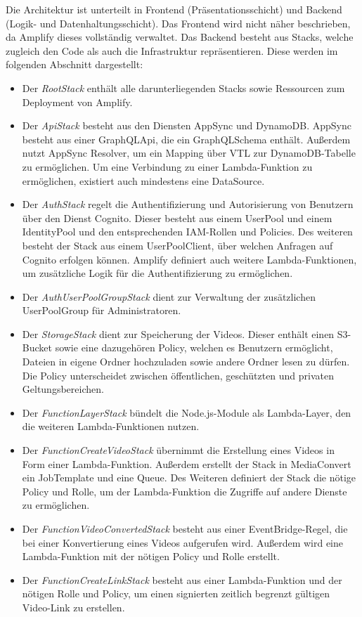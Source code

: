 Die Architektur ist unterteilt in Frontend (Präsentationsschicht) und Backend (Logik- und Datenhaltungsschicht). Das Frontend wird nicht näher beschrieben, da Amplify dieses vollständig verwaltet. Das Backend besteht aus Stacks, welche zugleich den Code als auch die Infrastruktur repräsentieren. Diese werden im folgenden Abschnitt dargestellt:
\begin{itemize}
  \item{Der \textit{RootStack} enthält alle darunterliegenden Stacks sowie Ressourcen zum Deployment von Amplify.}

  \item{Der \textit{ApiStack} besteht aus den Diensten AppSync und DynamoDB. AppSync besteht aus einer GraphQLApi, die ein GraphQLSchema enthält. Außerdem nutzt AppSync Resolver, um ein Mapping über VTL zur DynamoDB-Tabelle zu ermöglichen. Um eine Verbindung zu einer Lambda-Funktion zu ermöglichen, existiert auch mindestens eine DataSource.}

  \item{Der \textit{AuthStack} regelt die Authentifizierung und Autorisierung von Benutzern über den Dienst Cognito. Dieser besteht aus einem UserPool und einem IdentityPool und den entsprechenden IAM-Rollen und Policies. Des weiteren besteht der Stack aus einem UserPoolClient, über welchen Anfragen auf Cognito erfolgen können. Amplify definiert auch weitere Lambda-Funktionen, um zusätzliche Logik für die Authentifizierung zu ermöglichen.}

  \item{Der \textit{AuthUserPoolGroupStack} dient zur Verwaltung der zusätzlichen UserPoolGroup für Administratoren.}

  \item{Der \textit{StorageStack} dient zur Speicherung der Videos. Dieser enthält einen S3-Bucket sowie eine dazugehören Policy, welchen es Benutzern ermöglicht, Dateien in eigene Ordner hochzuladen sowie andere Ordner lesen zu dürfen. Die Policy unterscheidet zwischen öffentlichen, geschützten und privaten Geltungsbereichen.}

  \item{Der \textit{FunctionLayerStack} bündelt die Node.js-Module als Lambda-Layer, den die weiteren Lambda-Funktionen nutzen.}

  \item{Der \textit{FunctionCreateVideoStack} übernimmt die Erstellung eines Videos in Form einer Lambda-Funktion. Außerdem erstellt der Stack in MediaConvert ein JobTemplate und eine Queue. Des Weiteren definiert der Stack die nötige Policy und Rolle, um der Lambda-Funktion die Zugriffe auf andere Dienste zu ermöglichen.}

  \item{Der \textit{FunctionVideoConvertedStack} besteht aus einer EventBridge-Regel, die bei einer Konvertierung eines Videos aufgerufen wird. Außerdem wird eine Lambda-Funktion mit der nötigen Policy und Rolle erstellt.}

  \item{Der \textit{FunctionCreateLinkStack} besteht aus einer Lambda-Funktion und der nötigen Rolle und Policy, um einen signierten zeitlich begrenzt gültigen Video-Link zu erstellen.}
\end{itemize}

